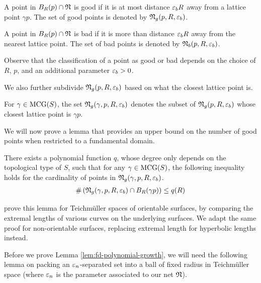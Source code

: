 \documentclass[12pt, reqno]{amsart}
\begin{document}
\begin{definition}
  A point in $B_R(p) \cap \mathfrak{N}$ is good if it is at most distance $\varepsilon_b R$ away from a lattice point $\gamma p$. The set of good points is denoted by $\mathfrak{N}_g(p, R, \varepsilon_b)$.
\end{definition}

\begin{definition}
  A point in $B_R(p) \cap \mathfrak{N}$ is bad if it is more than distance $\varepsilon_b R$ away from the nearest lattice point. The set of bad points is denoted by $\mathfrak{N}_b(p, R, \varepsilon_b)$.
\end{definition}

Observe that the classification of a point as good or bad depends on the choice of $R$, $p$, and an additional parameter $\varepsilon_b > 0$.

We also further subdivide $\mathfrak{N}_g(p, R, \varepsilon_b)$ based on what the closest lattice point is.

\begin{definition}
  For $\gamma \in \mathrm{MCG}(S)$, the set $\mathfrak{N}_g(\gamma, p, R, \varepsilon_b)$ denotes the subset of $\mathfrak{N}_g(p, R, \varepsilon_b)$ whose closest lattice point is $\gamma p$.
\end{definition}

We will now prove a lemma that provides an upper bound on the number of good points when restricted to a fundamental domain.

\begin{lemma}
  \label{lem:fd-polynomial-growth}
  There exists a polynomial function $q$, whose degree only depends on the topological type of $S$, such that for any $\gamma \in \mathrm{MCG}(S)$, the following inequality holds for the cardinality of points in $\mathfrak{N}_g(\gamma, p, R, \varepsilon_b)$.
  \begin{align*}
    \#\left( \mathfrak{N}_g(\gamma, p, R, \varepsilon_b) \cap B_R(\gamma p) \right) \leq q(R)
  \end{align*}
\end{lemma}

\begin{rem}
  \textcite[Lemma 3.2]{eskinmirzakhani} prove this lemma for Teichmüller spaces of orientable surfaces, by comparing the extremal lengths of various curves on the underlying surfaces.
  We adapt the same proof for non-orientable surfaces, replacing extremal length for hyperbolic lengths instead.
\end{rem}

Before we prove Lemma \ref{lem:fd-polynomial-growth}, we will need the following lemma on packing an $\varepsilon_n$-separated set into a ball of fixed radius in Teichmüller space (where $\varepsilon_n$ is the parameter associated to our net $\mathfrak{N}$).
\end{document}
